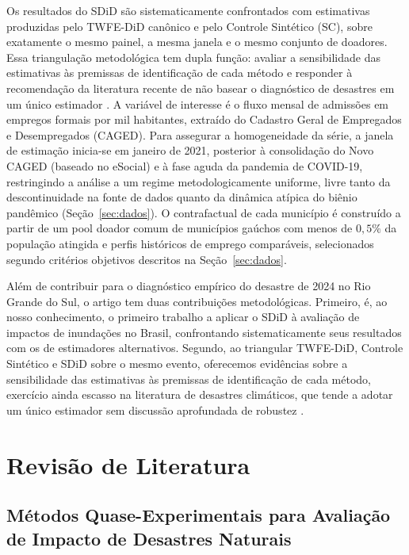 \documentclass[a4paper,12pt]{article}
\begin{document}
Os resultados do SDiD são sistematicamente confrontados com estimativas produzidas
pelo TWFE-DiD canônico e pelo Controle Sintético (SC), sobre exatamente o mesmo
painel, a mesma janela e o mesmo conjunto de doadores. Essa triangulação metodológica
tem dupla função: avaliar a sensibilidade das estimativas às premissas de identificação de
cada método e responder à recomendação da literatura recente de não basear o diagnóstico
de desastres em um único estimador \cite{botzen2019}. A variável de interesse é o fluxo
mensal de admissões em empregos formais por mil habitantes, extraído do Cadastro Geral
de Empregados e Desempregados (CAGED). Para assegurar a homogeneidade da série, a janela
de estimação inicia-se em janeiro de 2021, posterior à consolidação do Novo CAGED
(baseado no eSocial) e à fase aguda da pandemia de COVID-19, restringindo a análise a um
regime metodologicamente uniforme, livre tanto da descontinuidade na fonte de dados
quanto da dinâmica atípica do biênio pandêmico (Seção~\ref{sec:dados}). O contrafactual de
cada município é construído a partir de um pool doador comum de municípios gaúchos
com menos de $0{,}5\%$ da população atingida
e perfis históricos de emprego comparáveis, selecionados segundo
critérios objetivos descritos na Seção~\ref{sec:dados}.

Além de contribuir para o diagnóstico empírico do desastre de 2024 no Rio Grande do Sul,
o artigo tem duas contribuições metodológicas. Primeiro, é, ao nosso conhecimento, o
primeiro trabalho a aplicar o SDiD à avaliação de impactos de inundações no Brasil,
confrontando sistematicamente seus resultados com os de estimadores alternativos.
Segundo, ao triangular TWFE-DiD, Controle Sintético e SDiD sobre o mesmo evento,
oferecemos evidências sobre a sensibilidade das estimativas às premissas de identificação
de cada método, exercício ainda escasso na literatura de desastres climáticos, que tende
a adotar um único estimador sem discussão aprofundada de robustez \cite{botzen2019}.

\section{Revisão de Literatura}
\label{sec:revisao}

\subsection{Métodos Quase-Experimentais para Avaliação de Impacto de Desastres
Naturais}
\label{sub:metodos}
\end{document}
